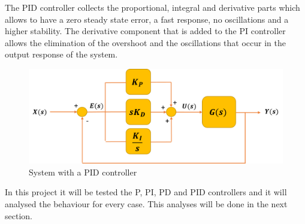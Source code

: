 The PID controller collects the proportional, integral and derivative parts which allows to have a zero steady state error, a fast response, no oscillations and a higher stability. The derivative component that is added to the PI controller allows the elimination of the overshoot and the oscillations that occur in the output response of the system. 

\begin{figure}[H]
	\centering
	\includegraphics[scale=0.6]{figures/PID_controller.png}
	\caption{System with a PID controller}
	\label{PID_controller}
\end{figure}

In this project it will be tested the P, PI, PD and PID controllers and it will analysed the behaviour for every case. This analyses will be done in the next section.